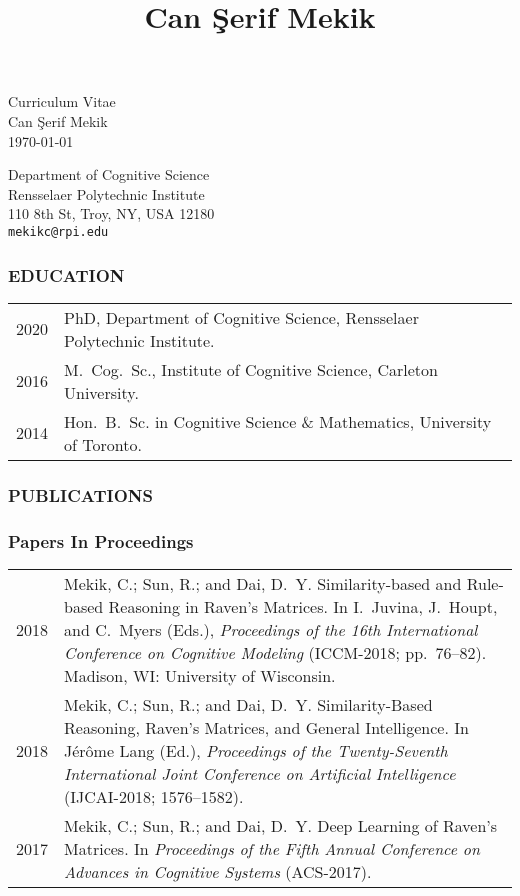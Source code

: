 \documentclass[12pt, letterpaper]{article}
\title{Can \c Serif Mekik}
\date{}
\begin{document}
\thispagestyle{empty}
\begin{center}
Curriculum Vitae\\
{\large Can \c Serif Mekik}\\
\today
\end{center}

\noindent Department of Cognitive Science\\
Rensselaer Polytechnic Institute\\
110 8th St, Troy, NY, USA 12180\\
\texttt{mekikc@rpi.edu}

\subsubsection*{EDUCATION}

\begin{longtable}{p{}p{}}
2020 & PhD, Department of Cognitive Science, Rensselaer Polytechnic Institute.\\
2016 & M.\ Cog.\ Sc., Institute of Cognitive Science, Carleton University.\\
2014 & Hon.\ B.\ Sc. in Cognitive Science \& Mathematics, University of Toronto.
\end{longtable}

\subsubsection*{PUBLICATIONS}

\subsubsection*{Papers In Proceedings}

\begin{longtable}{p{}p{}}
2018 & \noindent\hangindent=1cm Mekik, C.; Sun, R.; and Dai, D.\ Y. Similarity-based and Rule-based Reasoning in Raven's Matrices. In I.\ Juvina, J.\ Houpt, and C.\ Myers (Eds.), \emph{Proceedings of the 16th International Conference on Cognitive Modeling} (ICCM-2018; pp.\ 76--82). Madison, WI: University of Wisconsin.\\

2018 & \noindent\hangindent=1cm Mekik, C.; Sun, R.; and Dai, D.\ Y. Similarity-Based Reasoning, Raven's Matrices, and General Intelligence. In Jérôme Lang (Ed.), \emph{Proceedings of the Twenty-Seventh International Joint Conference on Artificial Intelligence} (IJCAI-2018; 1576--1582).\\

2017 & \noindent\hangindent=1cm Mekik, C.; Sun, R.; and Dai, D.\ Y. Deep Learning of Raven's Matrices. In \emph{Proceedings of the Fifth Annual Conference on Advances in Cognitive Systems} (ACS-2017).
\end{longtable}
\end{document}
